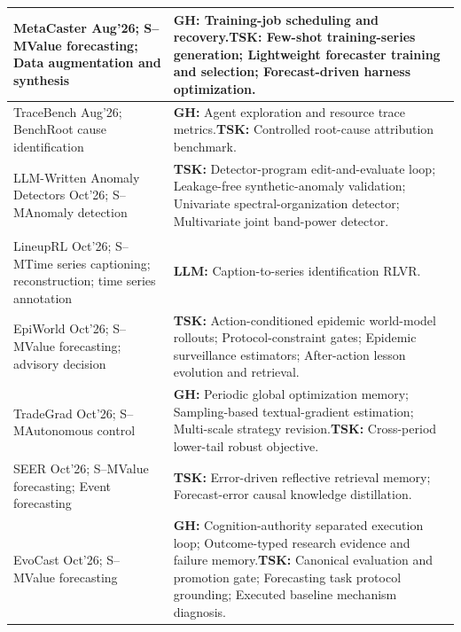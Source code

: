 \documentclass[preprints,article,submit,moreauthors]{Definitions/mdpi}
\newcommand{\typeSMshort}{\textsf{S--M}}
\newcommand{\typeBenchshort}{\textsf{Bench}}
\newcommand{\selfclaim}{\textsuperscript{\dag}}
\begin{document}
\begin{longtable}{@{}>{\raggedright\arraybackslash}p{}p{}@{}}
MetaCaster \citep{metacaster2026} Aug'26; \typeSMshort{}\newline Value forecasting; Data augmentation and synthesis & \textbf{GH:} Training-job scheduling and recovery.\newline\textbf{TSK:} Few-shot training-series generation; Lightweight forecaster training and selection; Forecast-driven harness optimization.\\\midrule
TraceBench \citep{tracebench2026} Aug'26; \typeBenchshort{}\newline Root cause identification & \textbf{GH:} Agent exploration and resource trace metrics.\newline\textbf{TSK:} Controlled root-cause attribution benchmark.\\\midrule
LLM-Written Anomaly Detectors \citep{llmanomalydetector2026} Oct'26; \typeSMshort{}\newline Anomaly detection & \textbf{TSK:} Detector-program edit-and-evaluate loop; Leakage-free synthetic-anomaly validation; Univariate spectral-organization detector; Multivariate joint band-power detector.\\\midrule
LineupRL \citep{lineuprl2026}\selfclaim{} Oct'26; \typeSMshort{}\newline Time series captioning; reconstruction; time series annotation & \textbf{LLM:} Caption-to-series identification RLVR.\\\midrule
EpiWorld \citep{epiworld2026} Oct'26; \typeSMshort{}\newline Value forecasting; advisory decision & \textbf{TSK:} Action-conditioned epidemic world-model rollouts; Protocol-constraint gates; Epidemic surveillance estimators; After-action lesson evolution and retrieval.\\\midrule
TradeGrad \citep{textualgradienttrading2026}\selfclaim{} Oct'26; \typeSMshort{}\newline Autonomous control & \textbf{GH:} Periodic global optimization memory; Sampling-based textual-gradient estimation; Multi-scale strategy revision.\newline\textbf{TSK:} Cross-period lower-tail robust objective.\\\midrule
SEER \citep{seer2026} Oct'26; \typeSMshort{}\newline Value forecasting; Event forecasting & \textbf{TSK:} Error-driven reflective retrieval memory; Forecast-error causal knowledge distillation.\\\midrule
EvoCast \citep{evocast2026} Oct'26; \typeSMshort{}\newline Value forecasting & \textbf{GH:} Cognition-authority separated execution loop; Outcome-typed research evidence and failure memory.\newline\textbf{TSK:} Canonical evaluation and promotion gate; Forecasting task protocol grounding; Executed baseline mechanism diagnosis.\\\midrule

\end{longtable}
\end{document}
